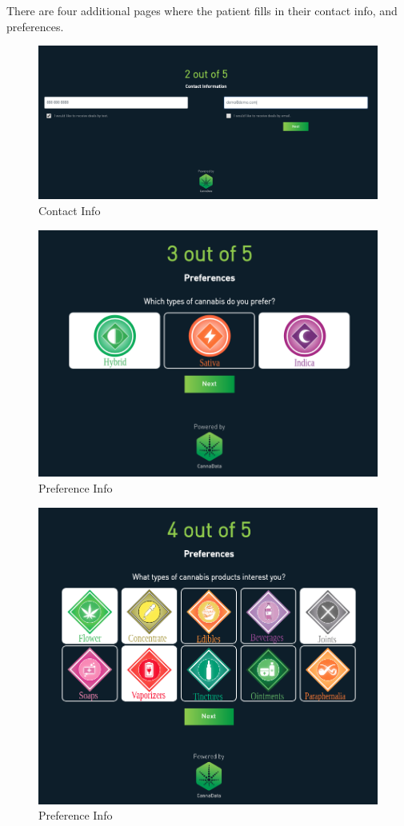 \documentclass[]{book}
\theoremstyle{definition}
\theoremstyle{definition}
\theoremstyle{definition}
\theoremstyle{remark}
\begin{document}
There are four additional pages where the patient fills in their contact
info, and preferences.

\begin{figure}
\centering
\includegraphics{images/S4.png}
\caption{Contact Info}
\end{figure}

\begin{figure}
\centering
\includegraphics{images/S2.png}
\caption{Preference Info}
\end{figure}

\begin{figure}
\centering
\includegraphics{images/S3.png}
\caption{Preference Info}
\end{figure}
\end{document}
